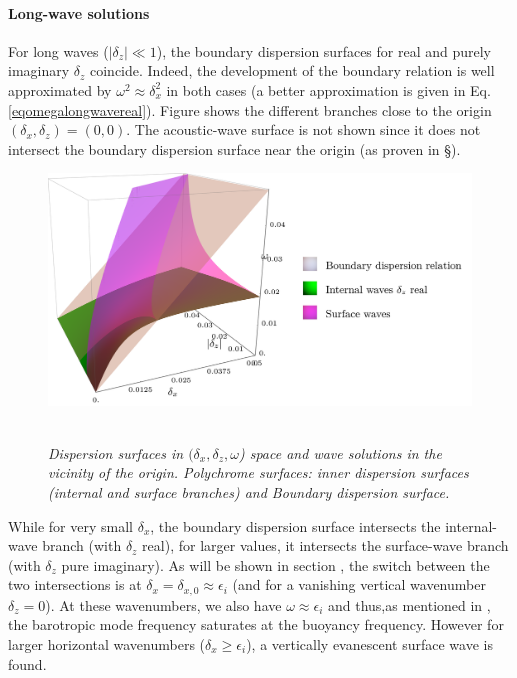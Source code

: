 \paragraph{Long-wave solutions}
For long waves ($|\delta_z| \ll 1$), the boundary dispersion surfaces for real and purely imaginary $\delta_z$ coincide. Indeed, the development of the boundary relation is well approximated by $\omega^2\approx \delta_x^2$ in both cases (a better approximation is given in Eq. \ref{eqomegalongwavereal}).
Figure  shows the different branches close to the origin $(\delta_x, \delta_z)=(0,0)$. The acoustic-wave surface is not shown since it does not intersect the boundary dispersion surface near the origin (as proven in \S{}).
\begin{figure}[!h]
	\centering		
		\includegraphics[width=0.6\linewidth]{FIGURES/boundedorigin.png}
	~
	
	\caption{\textit{Dispersion surfaces in $(\delta_x, \delta_z, \omega$) space and wave solutions in the vicinity of the origin. Polychrome surfaces: inner dispersion surfaces (internal and surface branches) and Boundary dispersion surface.
		}
	}
	\label{FigDisLongpSolutions}
\end{figure}
While for very small $\delta_x$, the boundary dispersion surface intersects the internal-wave branch (with $\delta_z$ real), for larger values, it intersects the surface-wave branch (with $\delta_z$ pure imaginary). As will be shown in section , the switch between the two intersections is at $\delta_x=\delta_{x,0}\approx \epsilon_i$ (and for a vanishing vertical wavenumber $\delta_z=0$). At these wavenumbers, we also have $\omega \approx \epsilon_i$ and thus,as mentioned in \cite{dukowicz_2013}, the barotropic mode frequency saturates at the buoyancy frequency. However for larger horizontal wavenumbers ($\delta_x \ge \epsilon_i$), a vertically evanescent surface wave is found.

